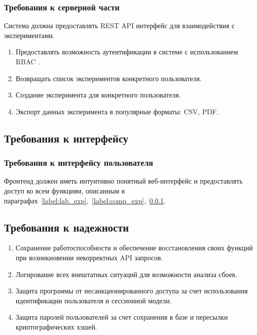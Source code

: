 \documentclass[a4paper,12pt,reqno]{article}
\begin{document}
    \subsubsection{Требования к серверной части} \label{"lable:backend"}
    Система должна предоставлять REST API \cite{technologies:REST} интерфейс для взаимодействия с экспериментами.
    \begin{enumerate}
        \item Предоставлять возможность аутентификации в системе с использованием RBAC \cite{arch:RBAC}.
        \item Возвращать список экспериментов конкретного пользователя.
        \item Создание эксперимента для конкретного пользователя.
        \item Экспорт данных эксперимента в популярные форматы: CSV\cite{Format:CSV}, PDF.
    \end{enumerate}

    \subsection{Требования к интерфейсу}

    \subsubsection{Требования к интерфейсу пользователя}
    Фронтенд должен иметь интуитивно понятный веб-интерфейс и предоставлять доступ ко всем функциям, описанным в параграфах~\ref{label:lab_exp},~\ref{label:comp_exp},~\ref{"lable:backend"}.

    \subsection{Требования к надежности}
    \begin{enumerate}
        \item Сохранение работоспособности и обеспечение восстановления своих функций при возникновении некорректных API запросов.
        \item Логирование всех внештатных ситуаций для возможности анализа сбоев.
        \item Защита программы от несанкционированного доступа за счет использования идентификации пользователя и сессионной модели.
        \item Защита паролей пользователей за счет сохранения в базе и пересылки криптографических хэшей.
    \end{enumerate}
\end{document}
